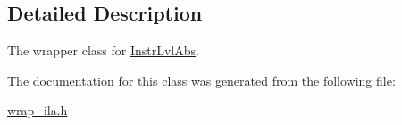 \subsection{Detailed Description}
The wrapper class for \mbox{\hyperlink{classilang_1_1_instr_lvl_abs}{Instr\+Lvl\+Abs}}. 

The documentation for this class was generated from the following file\+:\begin{DoxyCompactItemize}
\item 
\mbox{\hyperlink{wrap__ila_8h}{wrap\+\_\+ila.\+h}}\end{DoxyCompactItemize}
